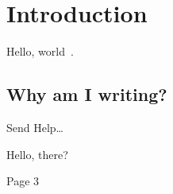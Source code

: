 \documentclass[ispdf]{usydthesis}
\begin{document}
\newpage

\begingroup
\hypersetup{linkcolor=black}
\let\cleardoublepage\relax
\let\clearpage\relax

\pagestyle{empty}
\tableofcontents

\pagestyle{empty}
\newpage
{}
{}
\listoffigures

\newpage
{}
{}
\pagestyle{empty}
\listoftables

\endgroup

\pagestyle{fancybook}
\cleardoublepage{}

\thispagestyle{fancybook}

\chapter{Introduction}
\label{ch:intro}

Hello, world~\cite{Nakamoto08-Bitcoin}.

\section{Why am I writing?}

Send Help\ldots

\newpage

Hello, there?

\newpage

Page 3

\cleardoublepage
{}
{}
\printbibliography
\end{document}
